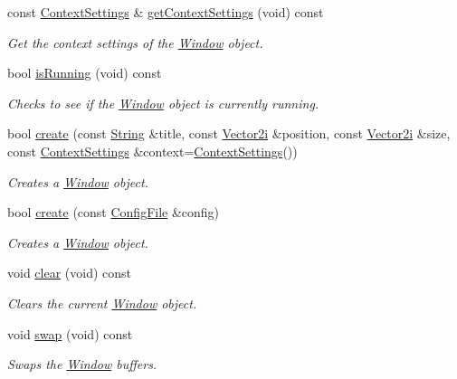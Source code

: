\begin{DoxyCompactItemize}
const \hyperlink{structsparky_1_1_context_settings}{Context\+Settings} \& \hyperlink{classsparky_1_1_window_a47c8ad006121cc432404880cff0c12b3}{get\+Context\+Settings} (void) const 
\begin{DoxyCompactList}\small\item\em Get the context settings of the \hyperlink{classsparky_1_1_window}{Window} object. \end{DoxyCompactList}\item 
bool \hyperlink{classsparky_1_1_window_a3ed4cf733081b4bbc147b5d5808adaac}{is\+Running} (void) const 
\begin{DoxyCompactList}\small\item\em Checks to see if the \hyperlink{classsparky_1_1_window}{Window} object is currently running. \end{DoxyCompactList}\item 
bool \hyperlink{classsparky_1_1_window_a146a77df577c6ca3e441a3c7f9bc2cbd}{create} (const \hyperlink{classsparky_1_1_string}{String} \&title, const \hyperlink{classsparky_1_1_vector2}{Vector2i} \&position, const \hyperlink{classsparky_1_1_vector2}{Vector2i} \&size, const \hyperlink{structsparky_1_1_context_settings}{Context\+Settings} \&context=\hyperlink{structsparky_1_1_context_settings}{Context\+Settings}())
\begin{DoxyCompactList}\small\item\em Creates a \hyperlink{classsparky_1_1_window}{Window} object. \end{DoxyCompactList}\item 
bool \hyperlink{classsparky_1_1_window_a5da0c3ab486de2f06e4d0124d85afed0}{create} (const \hyperlink{classsparky_1_1_config_file}{Config\+File} \&config)
\begin{DoxyCompactList}\small\item\em Creates a \hyperlink{classsparky_1_1_window}{Window} object. \end{DoxyCompactList}\item 
void \hyperlink{classsparky_1_1_window_a92cf43e19d310fea158098d8eb01c590}{clear} (void) const 
\begin{DoxyCompactList}\small\item\em Clears the current \hyperlink{classsparky_1_1_window}{Window} object. \end{DoxyCompactList}\item 
void \hyperlink{classsparky_1_1_window_a155728f06dbc5742250649e3ec8fc779}{swap} (void) const 
\begin{DoxyCompactList}\small\item\em Swaps the \hyperlink{classsparky_1_1_window}{Window} buffers. \end{DoxyCompactList}\item 

\end{DoxyCompactItemize}
